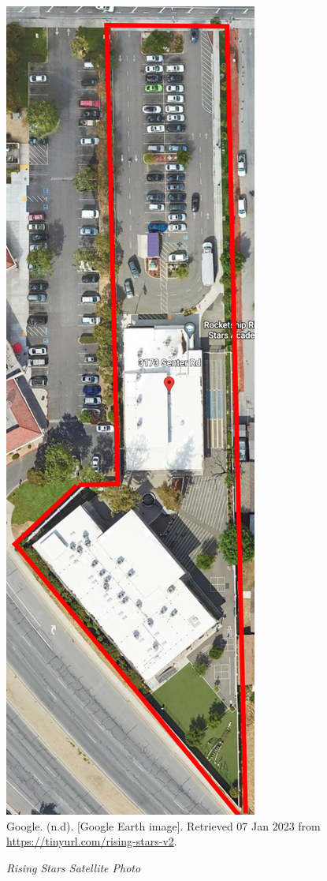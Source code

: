 \begin{figure}[hbt]
  \centering
  \caption[Rising Stars Satellite Photo]{\textit{Rising Stars Satellite Photo}}\label{fig:rising-stars-sat-photo}
  \includegraphics[height=0.667\textheight]{Satellite-Photos/rising-stars-sat-photo}\\ %
  \footnotesize{Google. (n.d). [Google Earth image]. Retrieved 07 Jan 2023 from \url{https://tinyurl.com/rising-stars-v2}.}
\end{figure}


